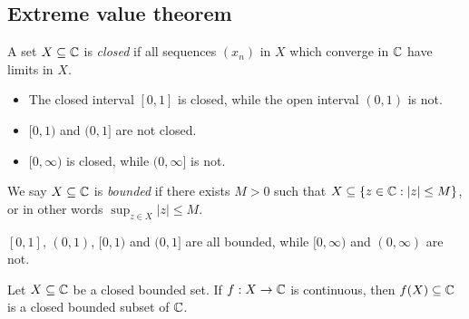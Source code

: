 \documentclass{../../template/note}
\begin{document}
    \subsection{Extreme value theorem}

    \begin{definition}
        A set \(X \subseteq \mathbb C\) is \emph{closed} if all sequences \((x_n)\) in \(X\) which converge in \(\mathbb C\) have limits in \(X\).
    \end{definition}
    
    \begin{example*}
        \begin{itemize}
            \item The closed interval \([0, 1]\) is closed, while the open interval \((0, 1)\) is not.
            \item \([0, 1)\) and \((0, 1]\) are not closed.
            \item \([0, \infty)\) is closed, while \((0, \infty]\) is not.
        \end{itemize}
    \end{example*}

    \begin{definition}
        We say \(X \subseteq \mathbb C\) is \emph{bounded} if there exists \(M > 0\) such that \(X \subseteq \{z \in \mathbb C: |z| \leq M\}\), or in other words \(\sup_{z \in X} |z| \leq M\).
    \end{definition}
    
    \begin{example*}
        \([0, 1]\), \((0, 1)\), \([0, 1)\) and \((0, 1]\) are all bounded, while \([0, \infty)\) and \((0, \infty)\) are not.
    \end{example*}
    
    \begin{proposition}
        \label{cts-preserves-cbdd}
        Let \(X \subseteq \mathbb C\) be a closed bounded set. If \(f: X \to \mathbb C\) is continuous, then \(f(X) \subseteq \mathbb C\) is a closed bounded subset of \(\mathbb C\).
    \end{proposition}
\end{document}
